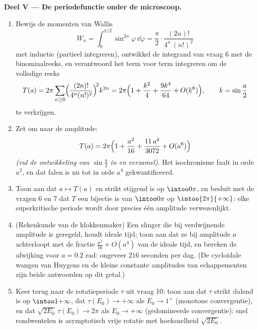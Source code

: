 \begin{problem}
\medskip
\noindent\textbf{Deel V --- De periodefunctie onder de
microscoop.}
\begin{enumerate}[resume]
  \item Bewijs de momenten van Wallis
        \[
        W_n = \int_0^{\pi/2}\sin^{2n}\varphi\,\dd\varphi
        = \frac\pi2\cdot\frac{(2n)!}{4^n\,(n!)^2}
        \]
        met inductie (partieel integreren), ontwikkel de
        integrand van vraag 6 met de binomiaalreeks, en
        verantwoord het term voor term integreren om de volledige
        reeks
        \[
        T(a) = 2\pi\sum_{n\geq0}
        \Bigl(\frac{(2n)!}{4^n(n!)^2}\Bigr)^{\!2}k^{2n}
        = 2\pi\Bigl(1 + \frac{k^2}4 + \frac{9k^4}{64}
        + O(k^6)\Bigr),
        \qquad k = \sin\frac a2
        \]
        te verkrijgen.
  \item Zet om naar de amplitude:
        \[
        T(a) = 2\pi\Bigl(1 + \frac{a^2}{16} +
        \frac{11\,a^4}{3072} + O(a^6)\Bigr)
        \]
        \emph{(vul de ontwikkeling van $\sin\frac a2$ in en
        verzamel)}. Het isochronisme faalt in orde $a^2$, en dat
        falen is nu tot in orde $a^4$ gekwantificeerd.
  \item Toon aan dat $a \mapsto T(a)$  en strikt stijgend
        is op $\intoo0\pi$, en besluit met de vragen 6 en 7 dat
        $T$ een bijectie is van $\intoo0\pi$ op
        $\intoo{2\pi}{+\infty}$: elke superkritische periode
        wordt door precies één amplitude verwezenlijkt.
  \item (Rekenkunde van de klokkenmaker) Een slinger die bij
        verdwijnende amplitude is geregeld, houdt ideale tijd;
        toon aan dat ze bij amplitude $a$ achterloopt met de
        fractie $\frac{a^2}{16} + O(a^4)$ van de ideale tijd, en
        bereken de afwijking voor $a = 0.2$ rad: ongeveer $216$
        seconden per dag. (De cycloïdale wangen van Huygens en de
        kleine constante amplitudes van echappementen zijn beide
        antwoorden op dit getal.)
  \item Keer terug naar de rotatieperiode $\tau$ uit vraag 10:
        toon aan dat $\tau$ strikt dalend is op
        $\intoo1{+\infty}$, dat $\tau(E_0) \to +\infty$ als $E_0
        \to 1^+$ (monotone convergentie), en dat
        $\sqrt{2E_0}\,\tau(E_0) \to 2\pi$ als $E_0 \to +\infty$
        (gedomineerde convergentie): snel rondwentelen is
        asymptotisch vrije rotatie met hoeksnelheid
        $\sqrt{2E_0}$.
\end{enumerate}


\end{problem}
